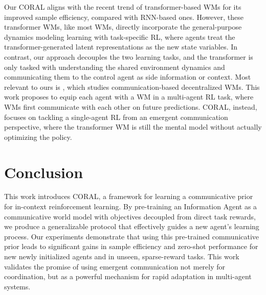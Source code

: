 \documentclass[letterpaper]{article} %
\begin{document}
Our CORAL aligns with the recent trend of transformer-based WMs \cite{micheli2023transformers, robine2023transformerbased} for its improved sample efficiency, compared with RNN-based ones. However, these transformer WMs, like most WMs, directly incorporate the general-purpose dynamics modeling learning with task-specific RL, where agents treat the transformer-generated latent representations as the new state variables.  In contrast, our approach decouples the two learning tasks, and the transformer is only tasked with understanding the shared environment dynamics and communicating them to the control agent as side information or context. Most relevant to ours is \cite{toledocodreamer}, which studies communication-based decentralized WMs. This work proposes to equip each agent with a WM in a multi-agent RL task, where WMs first communicate with each other on future predictions. CORAL, instead, focuses on tackling a single-agent RL from an emergent communication perspective, where the transformer WM is still the mental model without actually optimizing the policy. 


\section{Conclusion}
This work introduces CORAL, a framework for learning a communicative prior for in-context reinforcement learning. By pre-training an Information Agent as a communicative world model with objectives decoupled from direct task rewards, we produce a generalizable protocol that effectively guides a new agent's learning process. Our experiments demonstrate that using this pre-trained communicative prior leads to significant gains in sample efficiency and zero-shot performance for new newly initialized agents and in unseen, sparse-reward tasks. This work validates the promise of using emergent communication not merely for coordination, but as a powerful mechanism for rapid adaptation in multi-agent systems.





\clearpage

% 
\end{document}
